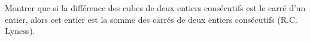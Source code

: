 Montrer que si la différence des cubes de deux entiers consécutifs est le carré d'un entier, alors cet entier est la somme des carrés de deux entiers consécutifs (R.C. Lyness).
